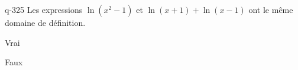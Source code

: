 \begin{truefalse}{q-325}
Les expressions $\ln(x^2-1)$ et $\ln(x+1)+\ln(x-1)$ ont le même domaine de définition.
\item Vrai
\item* Faux
\end{truefalse}

